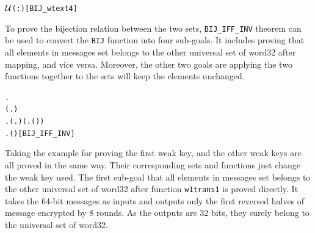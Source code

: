 \documentclass{article}
\begin{document}
\begin{alltt}
\HOLTokenTurnstile{}    \ensuremath{{\cal{U}}}(:)\hfill{[BIJ_wtext4]}
\end{alltt}

To prove the bijection relation between the two sets, \verb|BIJ_IFF_INV| theorem can be used to convert the \verb|BIJ| function into
four sub-goals. It includes proving that all elements in messages set belongs to the other universal set of word32 after mapping,
and vice versa. Moreover, the other two goals are applying the two functions together to the sets will keep the elements unchanged.

\begin{alltt}
\HOLTokenTurnstile{} \HOLSymConst{\HOLTokenForall{}}  .
         \HOLSymConst{\HOLTokenEquiv{}}
     (\HOLSymConst{\HOLTokenForall{}}.  \HOLSymConst{\HOLTokenIn{}}  \HOLSymConst{\HOLTokenImp{}}   \HOLSymConst{\HOLTokenIn{}} ) \HOLSymConst{\HOLTokenConj{}}
     \HOLSymConst{\HOLTokenExists{}}. (\HOLSymConst{\HOLTokenForall{}}.  \HOLSymConst{\HOLTokenIn{}}  \HOLSymConst{\HOLTokenImp{}}   \HOLSymConst{\HOLTokenIn{}} ) \HOLSymConst{\HOLTokenConj{}} (\HOLSymConst{\HOLTokenForall{}}.  \HOLSymConst{\HOLTokenIn{}}  \HOLSymConst{\HOLTokenImp{}}  ( ) \HOLSymConst{=} ) \HOLSymConst{\HOLTokenConj{}}
         \HOLSymConst{\HOLTokenForall{}}.  \HOLSymConst{\HOLTokenIn{}}  \HOLSymConst{\HOLTokenImp{}}  ( ) \HOLSymConst{=} \hfill{[BIJ_IFF_INV]}
\end{alltt}

Taking the example for proving the first weak key, and the other weak keys are all proved in the same way. Their corresponding
sets and functions just change the weak key used.
The first sub-goal that all elements in messages set belongs to the other universal set of word32 after function \verb|w1trans1| is
proved directly. It takes the 64-bit messages as inputs and outputs only the first reversed halves of message encrypted by 8
rounds. As the outputs are 32 bits, they surely belong to the universal set of word32.
\end{document}
